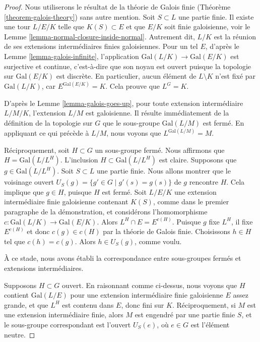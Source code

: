 \begin{proof}
Nous utiliserons le résultat de la théorie de Galois finie
(Théorème \ref{theorem-galois-theory})
sans autre mention.
Soit $S \subset L$ une partie finie. Il existe une tour
$L/E/K$ telle que $K(S) \subset E$ et que
$E/K$ soit finie galoisienne, voir le Lemme \ref{lemma-normal-closure-inside-normal}.
Autrement dit, $L/K$ est la réunion de ses extensions intermédiaires
finies galoisiennes.
Pour un tel $E$, d'après le Lemme \ref{lemma-galois-infinite},
l'application $\text{Gal}(L/K) \to \text{Gal}(E/K)$ est surjective
et continue, c'est-à-dire que son noyau est ouvert puisque la topologie
sur $\text{Gal}(E/K)$ est discrète.
En particulier, aucun élément de $L \setminus K$ n'est fixé par
$\text{Gal}(L/K)$, car $E^{\text{Gal}(E/K)} = K$.
Cela prouve que $L^G = K$.

\medskip\noindent
D'après le Lemme \ref{lemma-galois-goes-up}, pour toute extension intermédiaire $L/M/K$,
l'extension $L/M$ est galoisienne. Il résulte immédiatement de la définition
de la topologie sur $G$ que le sous-groupe $\text{Gal}(L/M)$ est fermé.
En appliquant ce qui précède à $L/M$, nous voyons que $L^{\text{Gal}(L/M)} = M$.

\medskip\noindent
Réciproquement, soit $H \subset G$ un sous-groupe fermé. Nous affirmons que
$H = \text{Gal}(L/L^H)$. L'inclusion $H \subset \text{Gal}(L/L^H)$
est claire. Supposons que $g \in \text{Gal}(L/L^H)$. Soit $S \subset L$
une partie finie. Nous allons montrer que le voisinage ouvert
$U_S(g) = \{g' \in G \mid g'(s) = g(s)\}$ de $g$ rencontre $H$.
Cela implique que $g \in H$, puisque $H$ est fermé.
Soit $L/E/K$ une extension intermédiaire finie galoisienne contenant $K(S)$,
comme dans le premier paragraphe de la démonstration, et considérons l'homomorphisme
$c : \text{Gal}(L/K) \to \text{Gal}(E/K)$.
Alors $L^H \cap E = E^{c(H)}$. Puisque $g$ fixe $L^H$, il fixe
$E^{c(H)}$ et donc $c(g) \in c(H)$ par la théorie de Galois finie.
Choisissons $h \in H$ tel que $c(h) = c(g)$. Alors $h \in U_S(g)$, comme voulu.

\medskip\noindent
À ce stade, nous avons établi la correspondance entre sous-groupes fermés
et extensions intermédiaires.

\medskip\noindent
Supposons $H \subset G$ ouvert. En raisonnant comme ci-dessus, nous voyons que
$H$ contient $\text{Gal}(L/E)$ pour une extension intermédiaire finie
galoisienne $E$ assez grande, et que $L^H$ est contenu
dans $E$, donc fini sur $K$. Réciproquement, si $M$ est une extension
intermédiaire finie, alors $M$ est engendré par une partie finie $S$,
et le sous-groupe correspondant est l'ouvert $U_S(e)$,
où $e \in G$ est l'élément neutre.


\end{proof}
